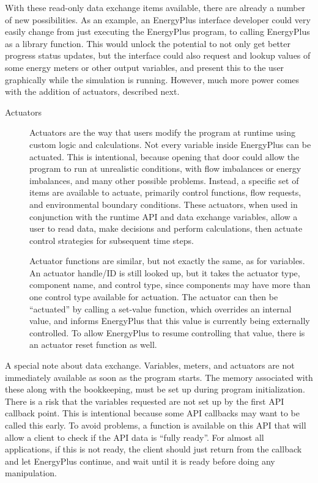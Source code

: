 With these read-only data exchange items available, there are already a number of new possibilities.
As an example, an EnergyPlus interface developer could very easily change from just executing the EnergyPlus program, to calling EnergyPlus as a library function.
This would unlock the potential to not only get better progress status updates, but the interface could also request and lookup values of some energy meters or other output variables, and present this to the user graphically while the simulation is running.
However, much more power comes with the addition of actuators, described next.

\begin{description}
 \item[Actuators] Actuators are the way that users modify the program at runtime using custom logic and calculations.
                  Not every variable inside EnergyPlus can be actuated.
                  This is intentional, because opening that door could allow the program to run at unrealistic conditions, with flow imbalances or energy imbalances, and many other possible problems.
                  Instead, a specific set of items are available to actuate, primarily control functions, flow requests, and environmental boundary conditions.
                  These actuators, when used in conjunction with the runtime API and data exchange variables, allow a user to read data, make decisions and perform calculations, then actuate control strategies for subsequent time steps.

 Actuator functions are similar, but not exactly the same, as for variables.
 An actuator handle/ID is still looked up, but it takes the actuator type, component name, and control type, since components may have more than one control type available for actuation.
 The actuator can then be ``actuated'' by calling a set-value function, which overrides an internal value, and informs EnergyPlus that this value is currently being externally controlled.
 To allow EnergyPlus to resume controlling that value, there is an actuator reset function as well.
\end{description}

A special note about data exchange.
Variables, meters, and actuators are not immediately available as soon as the program starts.
The memory associated with these along with the bookkeeping, must be set up during program initialization.
There is a risk that the variables requested are not set up by the first API callback point.
This is intentional because some API callbacks may want to be called this early.
To avoid problems, a function is available on this API that will allow a client to check if the API data is ``fully ready''.
For almost all applications, if this is not ready, the client should just return from the callback and let EnergyPlus continue, and wait until it is ready before doing any manipulation.

